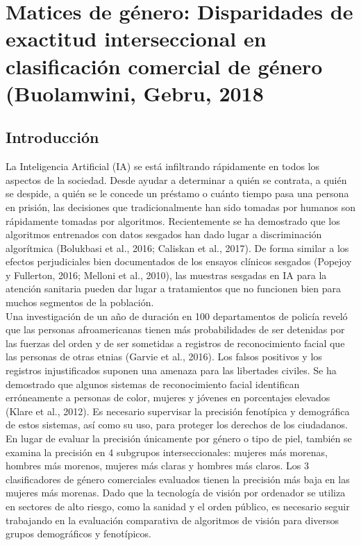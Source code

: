 \chapter{Matices de género: Disparidades de exactitud interseccional en clasificación comercial de género (Buolamwini, Gebru, 2018}

\section{Introducción}
La Inteligencia Artificial (IA) se está infiltrando rápidamente en todos los aspectos de la sociedad. Desde ayudar a determinar a quién se contrata, a quién se despide, a quién se le concede un préstamo o cuánto tiempo pasa una persona en prisión, las decisiones que tradicionalmente han sido tomadas por humanos son rápidamente tomadas por algoritmos. Recientemente se ha demostrado que los algoritmos entrenados con datos sesgados han dado lugar a discriminación algorítmica (Bolukbasi et al., 2016; Caliskan et al., 2017). De forma similar a los efectos perjudiciales bien documentados de los ensayos clínicos sesgados (Popejoy y Fullerton, 2016; Melloni et al., 2010), las muestras sesgadas en IA para la atención sanitaria pueden dar lugar a tratamientos que no funcionen bien para muchos segmentos de la población.\\
Una investigación de un año de duración en 100 departamentos de policía reveló que las personas afroamericanas tienen más probabilidades de ser detenidas por las fuerzas del orden y de ser sometidas a registros de reconocimiento facial que las personas de otras etnias (Garvie et al., 2016). Los falsos positivos y los registros injustificados suponen una amenaza para las libertades civiles. Se ha demostrado que algunos sistemas de reconocimiento facial identifican erróneamente a personas de color, mujeres y jóvenes en porcentajes elevados (Klare et al., 2012). Es necesario supervisar la precisión fenotípica y demográfica de estos sistemas, así como su uso, para proteger los derechos de los ciudadanos.\\

En lugar de evaluar la precisión únicamente por género o tipo de piel, también se examina la precisión en 4 subgrupos interseccionales: mujeres más morenas, hombres más morenos, mujeres más claras y hombres más claros. Los 3 clasificadores de género comerciales evaluados tienen la precisión más baja en las mujeres más morenas. Dado que la tecnología de visión por ordenador se utiliza en sectores de alto riesgo, como la sanidad y el orden público, es necesario seguir trabajando en la evaluación comparativa de algoritmos de visión para diversos grupos demográficos y fenotípicos.


